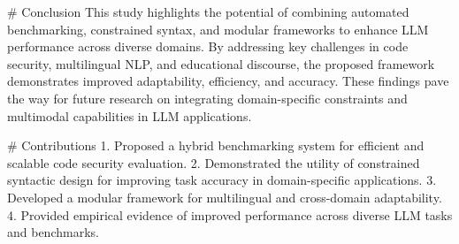# Conclusion
This study highlights the potential of combining automated benchmarking, constrained syntax, and modular frameworks to enhance LLM performance across diverse domains. By addressing key challenges in code security, multilingual NLP, and educational discourse, the proposed framework demonstrates improved adaptability, efficiency, and accuracy. These findings pave the way for future research on integrating domain-specific constraints and multimodal capabilities in LLM applications.

# Contributions
1. Proposed a hybrid benchmarking system for efficient and scalable code security evaluation.
2. Demonstrated the utility of constrained syntactic design for improving task accuracy in domain-specific applications.
3. Developed a modular framework for multilingual and cross-domain adaptability.
4. Provided empirical evidence of improved performance across diverse LLM tasks and benchmarks.